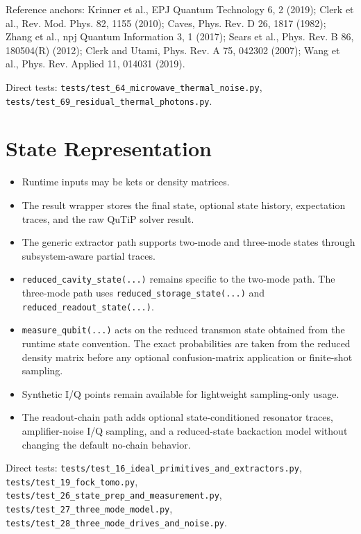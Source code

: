 \documentclass[11pt]{article}
\begin{document}
\noindent
Reference anchors: Krinner et al., EPJ Quantum Technology 6, 2 (2019);
Clerk et al., Rev. Mod. Phys. 82, 1155 (2010); Caves, Phys. Rev. D 26, 1817
(1982); Zhang et al., npj Quantum Information 3, 1 (2017); Sears et al.,
Phys. Rev. B 86, 180504(R) (2012); Clerk and Utami, Phys. Rev. A 75, 042302
(2007); Wang et al., Phys. Rev. Applied 11, 014031 (2019).

\noindent
Direct tests:
\texttt{tests/test\_64\_microwave\_thermal\_noise.py},
\texttt{tests/test\_69\_residual\_thermal\_photons.py}.

\section{State Representation}
\begin{itemize}[leftmargin=1.5em]
  \item Runtime inputs may be kets or density matrices.
  \item The result wrapper stores the final state, optional state history,
  expectation traces, and the raw QuTiP solver result.
  \item The generic extractor path supports two-mode and three-mode states through
  subsystem-aware partial traces.
  \item \texttt{reduced\_cavity\_state(...)} remains specific to the two-mode path.
  The three-mode path uses \texttt{reduced\_storage\_state(...)} and
  \texttt{reduced\_readout\_state(...)}.
  \item \texttt{measure\_qubit(...)} acts on the reduced transmon state obtained
  from the runtime state convention. The exact probabilities are taken from the
  reduced density matrix before any optional confusion-matrix application or
  finite-shot sampling.
  \item Synthetic I/Q points remain available for lightweight sampling-only usage.
  \item The readout-chain path adds optional state-conditioned resonator traces,
  amplifier-noise I/Q sampling, and a reduced-state backaction model without
  changing the default no-chain behavior.
\end{itemize}

\noindent
Direct tests:
\texttt{tests/test\_16\_ideal\_primitives\_and\_extractors.py},
\texttt{tests/test\_19\_fock\_tomo.py},
\texttt{tests/test\_26\_state\_prep\_and\_measurement.py},
\texttt{tests/test\_27\_three\_mode\_model.py},
\texttt{tests/test\_28\_three\_mode\_drives\_and\_noise.py}.
\end{document}
